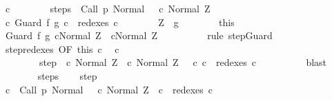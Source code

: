 \begin{isabellebody}
\ c{\isacharprime}\isanewline
\ \ \ \ \ \ \isamarkupfalse%
\ steps{\isacharcolon}\ {\isachardoublequoteopen}{\isasymGamma}{\isasymturnstile}\ {\isacharparenleft}Call\ p{\isacharcomma}\ Normal\ {\isasymsigma}{\isacharparenright}\ {\isasymrightarrow}\isactrlsup {\isacharplus}\ {\isacharparenleft}c{\isacharprime}{\isacharcomma}\ Normal\ Z{\isacharparenright}{\isachardoublequoteclose}\isanewline
\ \ \ \ \ \ \isamarkupfalse%
\ c{\isacharprime}{\isacharcolon}\ {\isachardoublequoteopen}Guard\ f\ g\ c\ {\isasymin}\ redexes\ c{\isacharprime}{\isachardoublequoteclose}\isanewline
\isanewline
\ \ \ \ \ \ \isamarkupfalse%
\ {\isachardoublequoteopen}Z\ {\isasymin}\ g{\isachardoublequoteclose}\isanewline
\ \ \ \ \ \ \isamarkupfalse%
\ this\ \isamarkupfalse%
\ {\isachardoublequoteopen}{\isasymGamma}{\isasymturnstile}{\isacharparenleft}Guard\ f\ g\ c{\isacharcomma}Normal\ Z{\isacharparenright}\ {\isasymrightarrow}\ {\isacharparenleft}c{\isacharcomma}Normal\ Z{\isacharparenright}{\isachardoublequoteclose}\isanewline
\ \ \ \ \ \ \ \ \isamarkupfalse%
\ {\isacharparenleft}rule\ step{\isachardot}Guard{\isacharparenright}\isanewline
\ \ \ \ \ \ \isamarkupfalse%
\ step{\isacharunderscore}redexes\ {\isacharbrackleft}OF\ this\ c{\isacharprime}{\isacharbrackright}\ \isamarkupfalse%
\ c{\isacharprime}{\isacharprime}\ \isanewline
\ \ \ \ \ \ \ \ step{\isacharcolon}\ {\isachardoublequoteopen}{\isasymGamma}{\isasymturnstile}\ {\isacharparenleft}c{\isacharprime}{\isacharcomma}\ Normal\ Z{\isacharparenright}\ {\isasymrightarrow}\ {\isacharparenleft}c{\isacharprime}{\isacharprime}{\isacharcomma}\ Normal\ Z{\isacharparenright}{\isachardoublequoteclose}\ \ \ c{\isacharprime}{\isacharprime}{\isacharcolon}\ {\isachardoublequoteopen}c\ {\isasymin}\ redexes\ c{\isacharprime}{\isacharprime}{\isachardoublequoteclose}\isanewline
\ \ \ \ \ \ \ \ \isamarkupfalse%
\ blast\isanewline
\ \ \ \ \ \ \isamarkupfalse%
\ steps\ \isamarkupfalse%
\ \isamarkupfalse%
\ step\ \isanewline
\ \ \ \ \ \ \isamarkupfalse%
\ \isamarkupfalse%
\ {\isachardoublequoteopen}{\isasymexists}c{\isacharprime}{\isachardot}\ {\isasymGamma}{\isasymturnstile}\ {\isacharparenleft}Call\ p{\isacharcomma}\ Normal\ {\isasymsigma}{\isacharparenright}\ {\isasymrightarrow}\isactrlsup {\isacharplus}\ {\isacharparenleft}c{\isacharprime}{\isacharcomma}\ Normal\ Z{\isacharparenright}\ {\isasymand}\ c\ {\isasymin}\ redexes\ c{\isacharprime}{\isachardoublequoteclose}\isanewline

\end{isabellebody}

